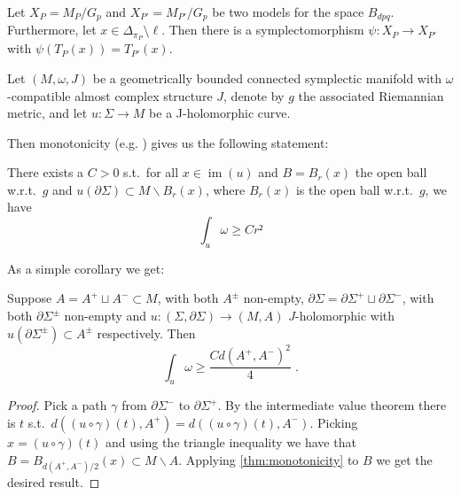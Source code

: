 \documentclass[12pt,a4paper,draft]{scrartcl}
\DeclareMathOperator{\im}{im}
\begin{document}
\begin{lemma}
    Let $X_{P} = M_P / G_p$ and $X_{P'} = M_{P'} / G_p$ be two models for the space $B_{dpq}$. Furthermore, let $x \in \Delta_{\pi_P} \setminus \ell$. Then there is a symplectomorphism $\psi \colon X_P \rightarrow X_{P'}$ with $\psi(T_P(x)) = T_{P'}(x)$. 
\end{lemma}



Let $(M,ω,J)$ be a geometrically bounded connected symplectic manifold with $ω$-compatible almost complex structure $J$, denote by $g$ the associated Riemannian metric, and let $u\colon Σ → M$ be a J-holomorphic curve.

Then monotonicity (e.g. \cite[Proposition 4.3.1 (ii)]{sikorav1994}) gives us the following statement:

\begin{lemma}[Monotonicity]
  \label{thm:monotonicity}
  There exists a $C>0$ s.t.\ for all $x ∈ \im(u)$ and $B = B_r(x)$ the open ball w.r.t.\ $g$ and $u(∂Σ) ⊂ M ∖ B_r(x)$, where $B_r(x)$ is the open ball w.r.t.\ $g$, we have
  \[∫_u ω ≥ C r²\]
\end{lemma}

As a simple corollary we get:

\begin{corollary}
  \label{thm:small_buffer}
  Suppose $A = A^+ ⊔ A^- ⊂ M$, with both $A^±$ non-empty, $∂Σ = ∂Σ^+ ⊔ ∂Σ^-$, with both $∂Σ^±$ non-empty and $u\colon (Σ,∂Σ) → (M,A)$ $J$-holomorphic with $u(∂Σ^±) ⊂ A^±$ respectively.
  Then
  \[∫_u ω ≥ \frac{C d(A^+,A^-)^2}{4} \; .\]
\end{corollary}

\begin{proof}
  Pick a path $γ$ from $∂Σ^-$ to $∂Σ^+$. By the intermediate value theorem there is $t$ s.t.\ $d((u ∘ γ) (t),A^+) = d((u ∘ γ)(t), A^-)$. Picking $x = (u ∘ γ)(t)$ and using the triangle inequality we have that $B = B_{d(A^+,A^-)/2}(x) ⊂ M ∖ A $. Applying \cref{thm:monotonicity} to $B$ we get the desired result.
\end{proof}
\end{document}
